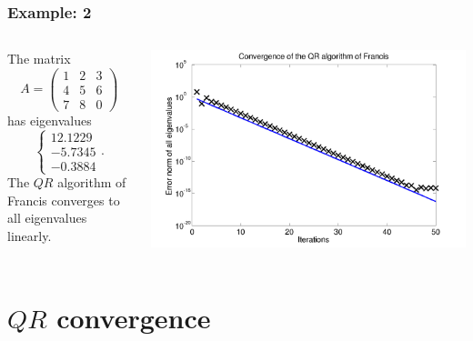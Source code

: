 \documentclass{beamer}
\begin{document}
\begin{frame}
  \frametitle{Example: 2}


  \begin{columns}
    \begin{column}{0.35\textwidth}
      The matrix
      \begin{equation*}
        A =
        \begin{pmatrix}
          1 & 2 & 3 \\
          4 & 5 & 6 \\
          7 & 8 & 0
        \end{pmatrix}
      \end{equation*}
      has eigenvalues
      \begin{equation*}
        \left\{
          \begin{array}{c}
            12.1229\\ -5.7345\\ -0.3884
          \end{array}\right. .
      \end{equation*}
      The $QR$ algorithm of Francis converges to all eigenvalues linearly.
    \end{column}
    \begin{column}{0.65\textwidth}
      \includegraphics[width=\textwidth]{figures/QRFrancis1}
    \end{column}
  \end{columns}


\end{frame}

\section{\texorpdfstring{$QR$ convergence}{QR convergence}}
\end{document}

